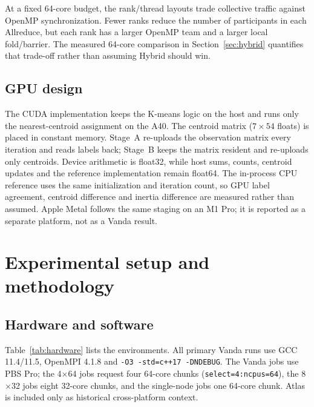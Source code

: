 \documentclass[10pt,a4paper]{article}
\newcommand{\code}[1]{\texttt{#1}}
\begin{document}
At a fixed 64-core budget, the rank/thread layouts trade collective traffic
against OpenMP synchronization. Fewer ranks reduce the number of participants
in each Allreduce, but each rank has a larger OpenMP team and a larger local
fold/barrier. The measured 64-core comparison in Section~\ref{sec:hybrid}
quantifies that trade-off rather than assuming Hybrid should win.

\subsection{GPU design}
The CUDA \citep{nickolls2008} implementation keeps the K-means logic on the host and runs only the
nearest-centroid assignment on the A40. The centroid matrix ($7\times54$
floats) is placed in constant memory. Stage~A re-uploads the observation matrix
every iteration and reads labels back; Stage~B keeps the matrix resident and
re-uploads only centroids. Device arithmetic is float32, while host sums,
counts, centroid updates and the reference implementation remain float64. The
in-process CPU reference uses the same initialization and iteration count, so
GPU label agreement, centroid difference and inertia difference are measured
rather than assumed. Apple Metal follows the same staging on an M1 Pro; it is
reported as a separate platform, not as a Vanda result.

\section{Experimental setup and methodology}
\subsection{Hardware and software}
Table~\ref{tab:hardware} lists the environments. All primary Vanda runs use
GCC 11.4/11.5, OpenMPI 4.1.8 and \code{-O3 -std=c++17 -DNDEBUG}. The Vanda
jobs use PBS Pro; the 4$\times$64 jobs request four 64-core chunks
(\code{select=4:ncpus=64}), the 8$\times$32 jobs eight 32-core chunks, and the
single-node jobs one 64-core chunk. Atlas is included only as historical
cross-platform context.
\end{document}
